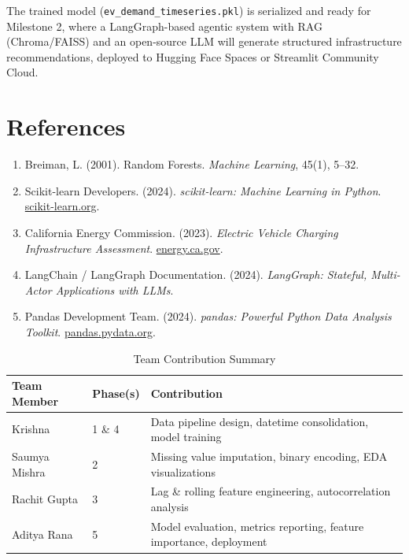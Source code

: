 \documentclass[12pt, a4paper]{article}
\begin{document}
The trained model (\texttt{ev\_demand\_timeseries.pkl}) is serialized and ready
for Milestone 2, where a LangGraph-based agentic system with RAG (Chroma/FAISS)
and an open-source LLM will generate structured infrastructure recommendations,
deployed to Hugging Face Spaces or Streamlit Community Cloud.

\section{References}

\begin{enumerate}
  \item Breiman, L. (2001). Random Forests. \textit{Machine Learning}, 45(1), 5--32.
  \item Scikit-learn Developers. (2024). \textit{scikit-learn: Machine Learning in Python}. \href{https://scikit-learn.org}{scikit-learn.org}.
  \item California Energy Commission. (2023). \textit{Electric Vehicle Charging Infrastructure Assessment}. \href{https://energy.ca.gov}{energy.ca.gov}.
  \item LangChain / LangGraph Documentation. (2024). \textit{LangGraph: Stateful, Multi-Actor Applications with LLMs}.
  \item Pandas Development Team. (2024). \textit{pandas: Powerful Python Data Analysis Toolkit}. \href{https://pandas.pydata.org}{pandas.pydata.org}.
\end{enumerate}

\vspace{1em}

\begin{table}[h!]
\centering
\caption{Team Contribution Summary}
\renewcommand{\arraystretch}{1.4}
\begin{tabularx}{\textwidth}{llX}
\toprule
\rowcolor{tableheader}
\color{white}\textbf{Team Member} &
\color{white}\textbf{Phase(s)} &
\color{white}\textbf{Contribution} \\
\midrule
Krishna       & 1 \& 4 & Data pipeline design, datetime consolidation, model training \\
\rowcolor{lightgray}
Saumya Mishra & 2      & Missing value imputation, binary encoding, EDA visualizations \\
Rachit Gupta  & 3      & Lag \& rolling feature engineering, autocorrelation analysis \\
\rowcolor{lightgray}
Aditya Rana   & 5      & Model evaluation, metrics reporting, feature importance, deployment\\
\bottomrule
\end{tabularx}
\end{table}
\end{document}

